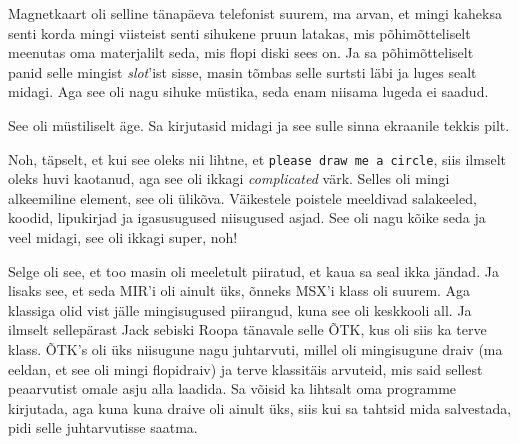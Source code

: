 
Magnetkaart oli selline  tänapäeva  telefonist suurem, ma arvan, et mingi 
kaheksa senti korda mingi viisteist senti sihukene pruun latakas, mis 
põhimõtteliselt meenutas oma materjalilt seda, mis flopi diski sees on. Ja sa 
põhimõtteliselt panid selle mingist \emph{slot}'ist sisse, masin tõmbas selle 
surtsti läbi ja luges sealt midagi. Aga see oli nagu sihuke müstika, seda enam 
niisama lugeda ei saadud. 


See oli  müstiliselt äge. Sa kirjutasid midagi ja see  sulle  sinna ekraanile 
tekkis pilt.


Noh, täpselt, et kui see oleks nii lihtne, et \verb|please draw me a circle|, 
siis  ilmselt oleks huvi kaotanud, aga see oli ikkagi \emph{complicated} värk. 
Selles oli mingi alkeemiline element, see oli ülikõva. Väikestele poistele 
meeldivad salakeeled, koodid, lipukirjad ja igasusugused niisugused asjad. See  
oli nagu kõike seda  ja veel midagi,  see oli ikkagi super, noh!

Selge oli see, et too masin oli  meeletult piiratud, et kaua sa seal ikka 
jändad. Ja lisaks see, et seda MIR'i oli ainult üks, õnneks MSX'i klass oli 
suurem. Aga klassiga olid vist jälle mingisugused piirangud, kuna see oli 
keskkooli all. Ja ilmselt sellepärast Jack sebiski 
Roopa tänavale selle ÕTK, kus oli siis ka terve klass. ÕTK's oli  üks niisugune 
nagu juhtarvuti, millel oli mingisugune draiv (ma eeldan, et see oli mingi 
flopidraiv) ja terve klassitäis arvuteid, mis said sellest peaarvutist omale 
asju alla laadida. Sa võisid ka lihtsalt oma programme kirjutada, aga kuna kuna 
draive oli ainult üks, siis kui sa tahtsid mida salvestada, pidi selle 
juhtarvutisse saatma. 

